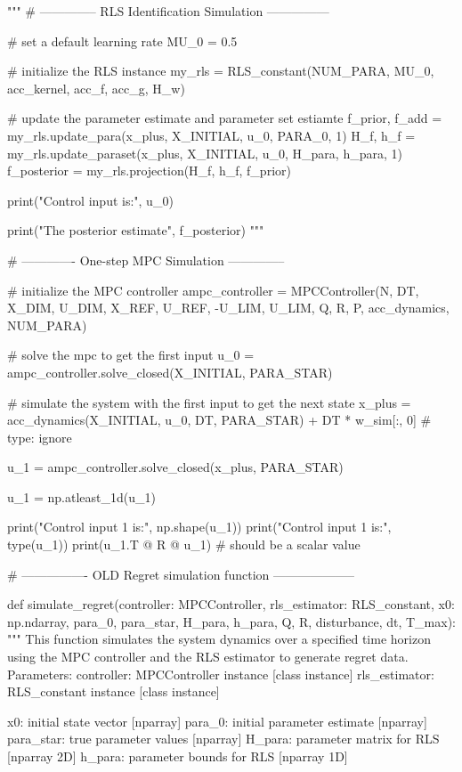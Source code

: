 """
# -------------- RLS Identification Simulation ---------------

# set a default learning rate
MU_0 = 0.5

# initialize the RLS instance
my_rls = RLS_constant(NUM_PARA, MU_0, acc_kernel, acc_f, acc_g, H_w)

# update the parameter estimate and parameter set estiamte
f_prior, f_add = my_rls.update_para(x_plus, X_INITIAL, u_0, PARA_0, 1)
H_f, h_f = my_rls.update_paraset(x_plus, X_INITIAL, u_0, H_para, h_para, 1)
f_posterior = my_rls.projection(H_f, h_f, f_prior)

print("Control input is:", u_0)

print("The posterior estimate", f_posterior)
"""


# ------------- One-step MPC Simulation --------------

# initialize the MPC controller
ampc_controller = MPCController(N, DT,
                                X_DIM, U_DIM,
                                X_REF, U_REF,
                                -U_LIM, U_LIM,
                                Q, R, P,
                                acc_dynamics, NUM_PARA)

# solve the mpc to get the first input
u_0 = ampc_controller.solve_closed(X_INITIAL, PARA_STAR)

# simulate the system with the first input to get the next state
x_plus = acc_dynamics(X_INITIAL, u_0, DT, PARA_STAR) + DT * w_sim[:, 0] # type: ignore

u_1 = ampc_controller.solve_closed(x_plus, PARA_STAR)

u_1 = np.atleast_1d(u_1)

print("Control input 1 is:", np.shape(u_1))
print("Control input 1 is:", type(u_1))
print(u_1.T @ R @ u_1)  # should be a scalar value


# ---------------- OLD Regret simulation function --------------------

def simulate_regret(controller: MPCController, rls_estimator: RLS_constant,
                    x0: np.ndarray, para_0, para_star, H_para, h_para,
                    Q, R,
                    disturbance, dt, T_max):
    """
    This function simulates the system dynamics over a specified time horizon
    using the MPC controller and the RLS estimator to generate regret data.
    Parameters: 
        controller: MPCController instance [class instance]
        rls_estimator: RLS_constant instance [class instance]

        x0: initial state vector [nparray]
        para_0: initial parameter estimate [nparray]
        para_star: true parameter values [nparray]
        H_para: parameter matrix for RLS [nparray 2D]
        h_para: parameter bounds for RLS [nparray 1D]

